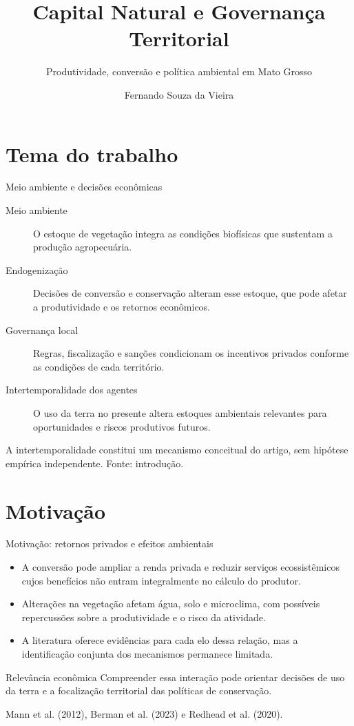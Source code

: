 \documentclass[aspectratio=169,11pt]{beamer}
\title[Capital natural e governança territorial]{Capital Natural e Governança Territorial}
\subtitle{Produtividade, conversão e política ambiental em Mato Grosso}
\author{Fernando Souza da Vieira}
\institute{Tópicos de Microeconomia}
\date{}
\newcommand{\fonte}[1]{\par\vfill{\fontsize{7.5}{9}\selectfont\color{gray}#1\par}}
\begin{document}
\begin{frame}
  \titlepage
\end{frame}

\section{Tema do trabalho}
\begin{frame}{Meio ambiente e decisões econômicas}
\begin{description}
\item[Meio ambiente] O estoque de vegetação integra as condições biofísicas que sustentam a produção agropecuária.
\medskip
\item[Endogenização] Decisões de conversão e conservação alteram esse estoque, que pode afetar a produtividade e os retornos econômicos.
\medskip
\item[Governança local] Regras, fiscalização e sanções condicionam os incentivos privados conforme as condições de cada território.
\medskip
\item[Intertemporalidade dos agentes] O uso da terra no presente altera estoques ambientais relevantes para oportunidades e riscos produtivos futuros.
\end{description}
\fonte{A intertemporalidade constitui um mecanismo conceitual do artigo, sem hipótese empírica independente. Fonte: introdução.}
\end{frame}

\section{Motivação}
\begin{frame}{Motivação: retornos privados e efeitos ambientais}
\begin{itemize}
\item A conversão pode ampliar a renda privada e reduzir serviços ecossistêmicos cujos benefícios não entram integralmente no cálculo do produtor.
\medskip
\item Alterações na vegetação afetam água, solo e microclima, com possíveis repercussões sobre a produtividade e o risco da atividade.
\medskip
\item A literatura oferece evidências para cada elo dessa relação, mas a identificação conjunta dos mecanismos permanece limitada.
\end{itemize}
\medskip
\begin{block}{Relevância econômica}
Compreender essa interação pode orientar decisões de uso da terra e a focalização territorial das políticas de conservação.
\end{block}
\fonte{Mann et al. (2012), Berman et al. (2023) e Redhead et al. (2020).}
\end{frame}
\end{document}
